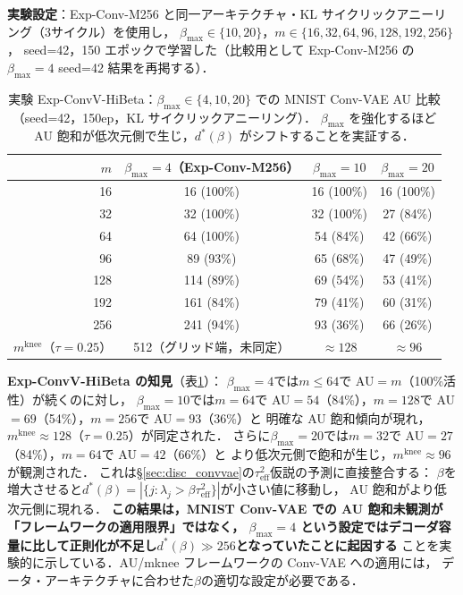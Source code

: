 \documentclass[11pt,a4paper]{jsarticle}
\newcommand{\mknee}{m^{\mathrm{knee}}}
\begin{document}
\textbf{実験設定}：Exp-Conv-M256 と同一アーキテクチャ・KL サイクリックアニーリング（3サイクル）を使用し，
$\beta_{\max} \in \{10, 20\}$，$m \in \{16, 32, 64, 96, 128, 192, 256\}$，
seed=42，150 エポックで学習した（比較用として Exp-Conv-M256 の$\beta_{\max}=4$ seed=42 結果を再掲する）．

\begin{table}[H]
\centering
\caption{実験 Exp-ConvV-HiBeta：$\beta_{\max} \in \{4, 10, 20\}$ での MNIST Conv-VAE AU 比較
（seed=42，150ep，KL サイクリックアニーリング）．
$\beta_{\max}$ を強化するほど AU 飽和が低次元側で生じ，$d^*(\beta)$ がシフトすることを実証する．}
\label{tab:hibeta}
\small
\begin{tabular}{r ccc}
\toprule
$m$ & $\beta_{\max}=4$（Exp-Conv-M256） & $\beta_{\max}=10$ & $\beta_{\max}=20$ \\
\midrule
 16  & 16  (100\%)& 16 (100\%) & 16 (100\%) \\
 32  & 32  (100\%)& 32 (100\%) & 27 (84\%)  \\
 64  & 64  (100\%)& 54 (84\%)  & 42 (66\%)  \\
 96  & 89  (93\%) & 65 (68\%)  & 47 (49\%)  \\
128  & 114 (89\%) & 69 (54\%)  & 53 (41\%)  \\
192  & 161 (84\%) & 79 (41\%)  & 60 (31\%)  \\
256  & 241 (94\%) & 93 (36\%)  & 66 (26\%)  \\
\midrule
$\mknee$（$\tau=0.25$） & 512（グリッド端，未同定） & $\approx 128$ & $\approx 96$ \\
\bottomrule
\end{tabular}
\end{table}

\textbf{Exp-ConvV-HiBeta の知見}（表\ref{tab:hibeta}）：
$\beta_{\max}=4$では$m \leq 64$で AU$=m$（100\%活性）が続くのに対し，
$\beta_{\max}=10$では$m=64$で AU$=54$（84\%），$m=128$で AU$=69$（54\%），$m=256$で AU$=93$（36\%）と
明確な AU 飽和傾向が現れ，$\mknee \approx 128$（$\tau=0.25$）が同定された．
さらに$\beta_{\max}=20$では$m=32$で AU$=27$（84\%），$m=64$で AU$=42$（66\%）と
より低次元側で飽和が生じ，$\mknee \approx 96$が観測された．
これは§\ref{sec:disc_convvae}の$\tau^2_\mathrm{eff}$仮説の予測に直接整合する：
$\beta$を増大させると$d^*(\beta) = |\{j: \lambda_j > \beta\tau^2_\mathrm{eff}\}|$が小さい値に移動し，
AU 飽和がより低次元側に現れる．
\textbf{この結果は，MNIST Conv-VAE での AU 飽和未観測が「フレームワークの適用限界」ではなく，
$\beta_{\max}=4$ という設定ではデコーダ容量に比して正則化が不足し$d^*(\beta) \gg 256$となっていたことに起因する}
ことを実験的に示している．AU/mknee フレームワークの Conv-VAE への適用には，
データ・アーキテクチャに合わせた$\beta$の適切な設定が必要である．
\end{document}
